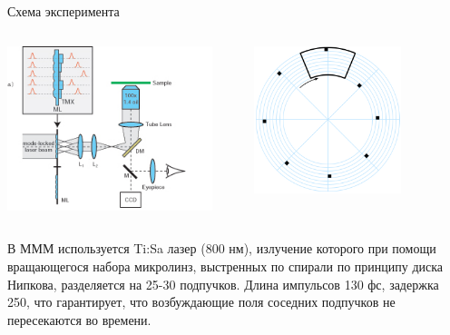 \documentclass[9pt, compress, xcolor=table]{beamer}
\begin{document}
\begin{frame}{Схема эксперимента}
\begin{columns}[c]
\column{6.5cm}
\begin{center}
\includegraphics[width=0.9\textwidth]{MMM}
\end{center}
\column{6.5cm}
\begin{center}
\includegraphics[width=0.7\textwidth]{MMM_0}
\end{center}
\end{columns}
В МММ используется Ti:Sa лазер (800 нм), излучение которого при помощи вращающегося набора микролинз, выстренных по спирали по принципу диска Нипкова, разделяется на 25-30 подпучков. Длина импульсов 130 фс, задержка 250, что гарантирует, что возбуждающие поля соседних подпучков не пересекаются во времени.
\end{frame}
\end{document}
